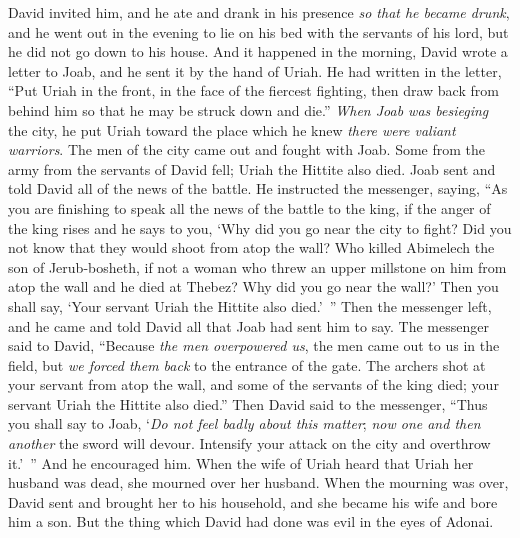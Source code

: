 \begin{biblechapter}
\verse David invited him, and he ate and drank in his presence \textit{so that he became drunk}, and he went out in the evening to lie on his bed with the servants of his lord, but he did not go down to his house.
\verse And it happened in the morning, David wrote a letter to Joab, and he sent it by the hand of Uriah.
\verse He had written in the letter, “Put Uriah in the front, in the face of the fiercest fighting, then draw back from behind him so that he may be struck down and die.”
\verse \textit{When Joab was besieging} the city, he put Uriah toward the place which he knew \textit{there were valiant warriors}.
\verse The men of the city came out and fought with Joab. Some from the army from the servants of David fell; Uriah the Hittite also died.
\verse Joab sent and told David all of the news of the battle.
\verse He instructed the messenger, saying, “As you are finishing to speak all the news of the battle to the king,
\verse if the anger of the king rises and he says to you, ‘Why did you go near the city to fight? Did you not know that they would shoot from atop the wall?
\verse Who killed Abimelech the son of Jerub-bosheth, if not a woman who threw an upper millstone on him from atop the wall and he died at Thebez? Why did you go near the wall?’ Then you shall say, ‘Your servant Uriah the Hittite also died.’ ”
\verse Then the messenger left, and he came and told David all that Joab had sent him to say.
\verse The messenger said to David, “Because \textit{the men overpowered us}, the men came out to us in the field, but \textit{we forced them back} to the entrance of the gate.
\verse The archers shot at your servant from atop the wall, and some of the servants of the king died; your servant Uriah the Hittite also died.”
\verse Then David said to the messenger, “Thus you shall say to Joab, ‘\textit{Do not feel badly about this matter}; \textit{now one and then another} the sword will devour. Intensify your attack on the city and overthrow it.’ ” And he encouraged him.
\verse When the wife of Uriah heard that Uriah her husband was dead, she mourned over her husband.
\verse When the mourning was over, David sent and brought her to his household, and she became his wife and bore him a son. But the thing which David had done was evil in the eyes of Adonai.
\end{biblechapter}

